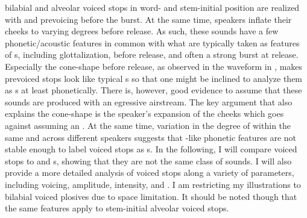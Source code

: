 \documentclass[output=paper]{LSP/langsci}
\begin{document}
 bilabial and alveolar voiced stops in word- and stem-initial position are realized with  and prevoicing before the burst. At the same time, speakers inflate their cheeks to varying degrees before release.   As such, these sounds have a few phonetic/acoustic features in common with what are typically taken as features of s, including glottalization,  before release, and often a strong burst at release. Especially the cone-shape  before release, as observed in the waveform in , makes  prevoiced stops look like typical s so that one might be inclined to analyze them as s at least phonetically. There is, however, good evidence to assume that these sounds are produced with an egressive airstream. The key argument that also explains the cone-shape  is the speaker's expansion of the cheeks which goes against assuming an . At the same time, variation in the degree of  within the same and across different speakers suggests that -like phonetic features are not stable enough to label  voiced stops as s. In the following, I will compare  voiced stops to  and  s, showing that they are not the same class of sounds. I will also provide a more detailed analysis of  voiced stops along a variety of parameters, including voicing, amplitude, intensity, and . I am restricting my illustrations to bilabial voiced plosives due to space limitation. It should be noted though that the same features apply to stem-initial alveolar voiced stops.
\end{document}
